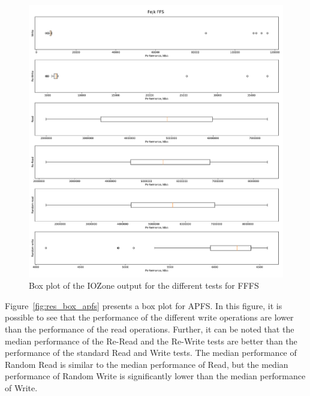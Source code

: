 \begin{figure}[!htb]
	\label{fig:res_box_fffs}
	\begin{center}
		\includegraphics[width=1.0\textwidth]{figures/benchmarking/fake-ffs/Fejk FFS-box.pdf}
	\end{center}
	\caption{Box plot of the IOZone output for the different tests for FFFS}
\end{figure}

Figure~\ref{fig:res_box_apfs} presents a box plot for APFS. In this figure, it is possible to see that the performance of the different write operations are lower than the performance of the read operations. Further, it can be noted that the median performance of the Re-Read and the Re-Write tests are better than the performance of the standard Read and Write tests. The median performance of Random Read is similar to the median performance of Read, but the median performance of Random Write is significantly lower than the median performance of Write.

